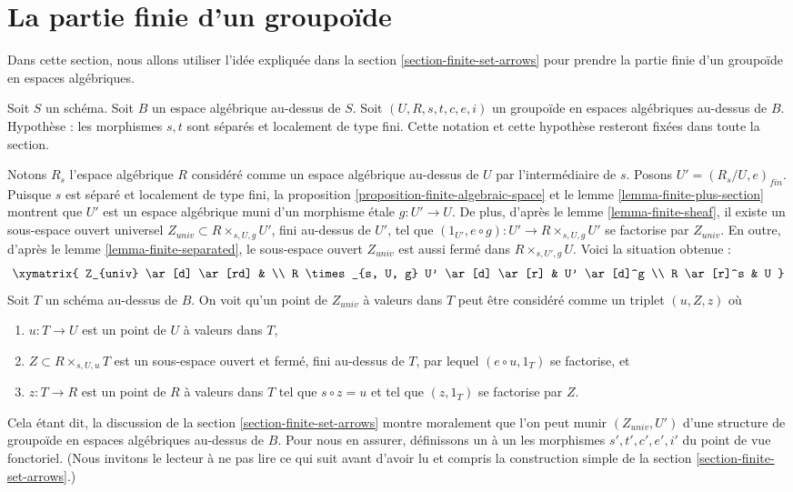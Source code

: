 \section{La partie finie d'un groupoïde}
\label{section-finite-part-groupoid}

\noindent
Dans cette section, nous allons utiliser l'idée expliquée dans
la section \ref{section-finite-set-arrows}
pour prendre la partie finie d'un groupoïde en espaces algébriques.

\medskip\noindent
Soit $S$ un schéma.
Soit $B$ un espace algébrique au-dessus de $S$.
Soit $(U, R, s, t, c, e, i)$ un groupoïde en espaces algébriques au-dessus de $B$.
Hypothèse : les morphismes $s, t$ sont séparés et localement de type fini.
Cette notation et cette hypothèse resteront fixées dans toute la section.

\medskip\noindent
Notons $R_s$ l'espace algébrique $R$ considéré comme un
espace algébrique au-dessus de $U$ par l'intermédiaire de $s$. Posons
$U' = (R_s/U, e)_{fin}$. Puisque $s$ est séparé et localement
de type fini, la
proposition \ref{proposition-finite-algebraic-space} et le
lemme \ref{lemma-finite-plus-section}
montrent que $U'$ est un espace algébrique muni d'un morphisme \'etale
$g : U' \to U$. De plus, d'après le
lemme \ref{lemma-finite-sheaf},
il existe un sous-espace ouvert universel
$Z_{univ} \subset R \times_{s, U, g} U'$, fini au-dessus de $U'$,
tel que $(1_{U'}, e \circ g) : U' \to R \times_{s, U, g} U'$
se factorise par $Z_{univ}$. En outre, d'après le
lemme \ref{lemma-finite-separated},
le sous-espace ouvert $Z_{univ}$ est aussi fermé dans
$R \times_{s, U', g} U$. Voici la situation obtenue :
$$
\xymatrix{
Z_{univ} \ar[d] \ar[rd] & \\
R \times_{s, U, g} U' \ar[d] \ar[r] & U' \ar[d]^g \\
R \ar[r]^s & U
}
$$
Soit $T$ un schéma au-dessus de $B$. On voit qu'un point de
$Z_{univ}$ à valeurs dans $T$ peut être considéré comme un triplet
$(u, Z, z)$ où
\begin{enumerate}
\item $u : T \to U$ est un point de $U$ à valeurs dans $T$,
\item $Z \subset R \times_{s, U, u} T$ est un sous-espace ouvert et fermé,
fini au-dessus de $T$, par lequel $(e \circ u, 1_T)$ se factorise, et
\item $z : T \to R$ est un point de $R$ à valeurs dans $T$ tel que
$s \circ z = u$ et tel que $(z, 1_T)$ se factorise par $Z$.
\end{enumerate}
Cela étant dit, la discussion de la
section \ref{section-finite-set-arrows}
montre moralement que l'on peut munir $(Z_{univ}, U')$ d'une structure de
groupoïde en espaces algébriques au-dessus de $B$. Pour nous en assurer,
définissons un à un les morphismes $s', t', c', e', i'$ du point de vue
fonctoriel. (Nous invitons le lecteur à ne pas lire ce qui suit avant d'avoir
lu et compris la construction simple de la
section \ref{section-finite-set-arrows}.)

